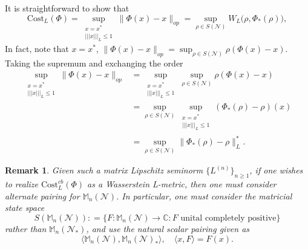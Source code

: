 \documentclass[11pt,reqno]{amsart}
\numberwithin{equation}{section}
\newtheorem{remark}[lemma]{Remark}
\newcommand{\mb}{\mathbb}
\newcommand{\mc}{\mathcal}
\newcommand{\Cost}{\mathrm{Cost}}
\begin{document}
It is straightforward to show that
\begin{equation}
    \Cost_{L}(\Phi) = \sup_{\substack{x=x^* \\ |||x|||_L \le 1}} \|\Phi(x) - x\|_{op} = \sup_{\rho \in S(\mc N)} W_L\big(\rho,\Phi_*(\rho)\big),
\end{equation}
In fact, note that $x = x^*$, $\|\Phi(x) - x\|_{op} = \sup_{\rho \in S(\mc N)} \rho(\Phi(x) - x)$. Taking the supremum and exchanging the order
\begin{align*}
    \sup_{\substack{x=x^* \\ |||x|||_L \le 1}} \|\Phi(x) - x\|_{op}&  = \sup_{\substack{x=x^* \\ |||x|||_L \le 1}} \sup_{\rho \in S(\mc N)} \rho(\Phi(x) - x) \\
    & = \sup_{\rho \in S(\mc N)} \sup_{\substack{x=x^* \\ |||x|||_L \le 1}} (\Phi_*(\rho) - \rho )(x) \\
    & = \sup_{\rho \in S(\mc N)} \|\Phi_*(\rho) - \rho\|_L^*.
\end{align*} 
\begin{remark}
Given such a matrix Lipschitz seminorm $\{L^{(n)}\}_{n\ge 1}$, if one wishes to realize $\Cost^{cb}_L(\Phi)$ as a Wasserstein L-metric, then one must consider alternate pairing for $\mb M_n(\mc N)$. In particular, one must consider the matricial state space $$S(\mb M_n(\mc N)): = \{F: \mb M_n(\mc N) \to \mb C: F\,\,\text{unital completely positive}\}$$ rather than $\mb M_n(\mc N_*)$, and use the natural scalar pairing given as \[\langle \mb M_n(\mc N), \mb M_n(\mc N)_*\rangle,\quad \langle x,F\rangle = F(x).\] 
\end{remark}

\end{document}
